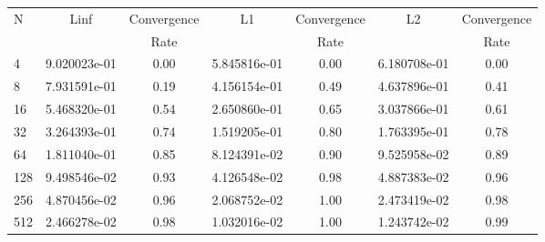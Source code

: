 \documentclass[12pt]{article}
\begin{document}
	\begin{tabular}{l|c|c|c|c|c|c}
		N&Linf&Convergence&L1&Convergence&L2&Convergence\\
		&&Rate&&Rate&&Rate\\
		\hline
		4&9.020023e-01&0.00&5.845816e-01&0.00&6.180708e-01&0.00\\
		\hline
		8&7.931591e-01&0.19&4.156154e-01&0.49&4.637896e-01&0.41\\
		\hline
		16&5.468320e-01&0.54&2.650860e-01&0.65&3.037866e-01&0.61\\
		\hline
		32&3.264393e-01&0.74&1.519205e-01&0.80&1.763395e-01&0.78\\
		\hline
		64&1.811040e-01&0.85&8.124391e-02&0.90&9.525958e-02&0.89\\
		\hline
		128&9.498546e-02&0.93&4.126548e-02&0.98&4.887383e-02&0.96\\
		\hline
		256&4.870456e-02&0.96&2.068752e-02&1.00&2.473419e-02&0.98\\
		\hline
		512&2.466278e-02&0.98&1.032016e-02&1.00&1.243742e-02&0.99\\
	\end{tabular}
\end{document}
